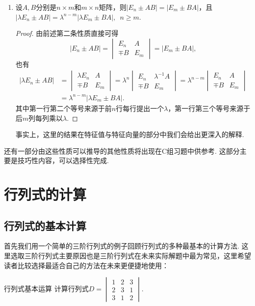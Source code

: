 \begin{enumerate}
    \item 设$A,B$分别是$n \times m$和$m \times n$矩阵，则$|E_n \pm AB|=|E_m \pm BA|$，且 \\
          $|\lambda E_n \pm AB|=\lambda^{n-m}|\lambda E_m \pm BA|,\enspace n \geqslant m$.
          \begin{proof}
              由前述第二条性质直接可得
              \[|E_n \pm AB|=\begin{vmatrix}
                      E_n & A \\ \mp B & E_m
                  \end{vmatrix}=|E_m \pm BA|,\]
              也有
              \begin{align*}
                  |\lambda E_n \pm AB|
                   & =\begin{vmatrix}
                          \lambda E_n & A \\ \mp B & E_m
                      \end{vmatrix}=\lambda^n
                  \begin{vmatrix}
                      E_n & \lambda^{-1}A \\ \mp B & E_m
                  \end{vmatrix}=\lambda^{n-m}\begin{vmatrix}
                                                 E_n & A \\ \mp B & E_m
                                             \end{vmatrix} \\
                   & = \lambda^{n-m}|\lambda E_m \pm BA|.
              \end{align*}
              其中第一行第二个等号来源于前$n$行每行提出一个$\lambda$，第一行第三个等号来源于后$m$列每列乘以$\lambda$.
          \end{proof}

          事实上，这里的结果在特征值与特征向量的部分中我们会给出更深入的解释.
\end{enumerate}

还有一部分由这些性质可以推导的其他性质将出现在C组习题中供参考. 这部分主要是技巧性内容，可以选择性完成.

\section{行列式的计算}

\subsection{行列式的基本计算}
首先我们用一个简单的三阶行列式的例子回顾行列式的多种最基本的计算方法. 这里选取三阶行列式主要原因也是三阶行列式在未来实际解题中最为常见，这里希望读者比较选择最适合自己的方法在未来更便捷地使用：
\begin{example}{}{行列式基本运算}
    计算行列式$D=\begin{vmatrix}
            1 & 2 & 3 \\
            2 & 3 & 1 \\
            3 & 1 & 2
        \end{vmatrix}$.
\end{example}

